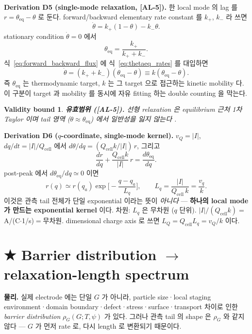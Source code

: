 \documentclass[11pt,a4paper]{article}
\newtheorem*{boundbox}{Validity bound}
\newcommand{\eq}{\mathrm{eq}}
\newcommand{\cell}{\mathrm{cell}}
\newcommand{\AL}[1]{\textsf{[AL-#1]}}
\begin{document}
\textbf{Derivation D5 (single-mode relaxation, \AL{5}).} 한 local mode 의 lag 를
$r=\theta_\eq-\theta$ 로 둔다. forward/backward elementary rate constant 를 $k_+$, $k_-$ 라 쓰면
\begin{equation}
\dot\theta
=
k_+(1-\theta)-k_-\theta.
\label{eq:forward_backward_flux}
\end{equation}
stationary condition $\dot\theta=0$ 에서
\begin{equation}
\theta_\eq=\frac{k_+}{k_++k_-}.
\label{eq:thetaeq_rates}
\end{equation}
식~\eqref{eq:forward_backward_flux} 에 식~\eqref{eq:thetaeq_rates} 를 대입하면
\begin{equation}
\dot\theta
=
(k_++k_-)(\theta_\eq-\theta)
\equiv
k(\theta_\eq-\theta).
\label{eq:first_order_relaxation}
\end{equation}
즉 $\theta_\eq$ 는 thermodynamic target, $k$ 는 그 target 으로 접근하는 kinetic mobility 다.
이 구분이 target 과 mobility 를 동시에 자유 fitting 하는 double counting 을 막는다.
\begin{boundbox}
\textbf{유효범위 (\AL{5}).} 선형 relaxation 은 equilibrium 근처 1차 Taylor 이며 tail 영역
($\theta\approx\theta_\eq$) 에서 일반성을 잃지 않는다 \cite{degrootmazur1962,onsager1931}.
\end{boundbox}

\textbf{Derivation D6 ($q$-coordinate, single-mode kernel).} $v_Q=|I|$, $dq/dt=|I|/Q_\cell$
에서 $d\theta/dq=(Q_\cell k/|I|)\,r$, 그리고
\begin{equation}
\frac{dr}{dq}+\frac{Q_\cell k}{|I|}\,r=\frac{d\theta_\eq}{dq}.
\label{eq:r_ode}
\end{equation}
post-peak 에서 $d\theta_\eq/dq\simeq0$ 이면
\begin{equation}
\boxed{\;r(q)\simeq r(q_a)\exp\!\Big[-\frac{q-q_a}{L_q}\Big],\qquad L_q=\frac{|I|}{Q_\cell\,k}=\frac{v_q}{k}.\;}
\label{eq:single_kernel}
\end{equation}
이것은 관측 tail 전체가 단일 exponential 이라는 뜻이 \emph{아니다} — \textbf{하나의 local
mode 가 만드는 exponential kernel} 이다. 차원: $L_q$ 은 무차원 ($q$ 단위). $|I|/(Q_\cell k)=$
A/(C$\cdot$1/s)$=$무차원. dimensional charge axis 로 쓰면 $L_Q=Q_\cell L_q=v_Q/k$ 이다.

\section{★ Barrier distribution $\to$ relaxation-length spectrum}\label{sec:spectrum}
\textbf{물리.} 실제 electrode 에는 단일 $G$ 가 아니라, particle size·local staging
environment·domain boundary·defect·stress·surface·transport 차이로 인한 \emph{barrier
distribution} $\rho_G(G;T,\psi)$ 가 있다. 그러나 관측 tail 의 shape 은 $\rho_G$ 와 같지
않다 — $G$ 가 먼저 rate 로, 다시 length 로 변환되기 때문이다.
\end{document}

